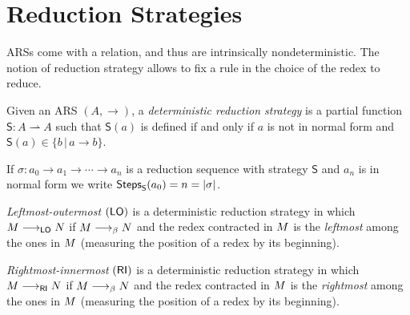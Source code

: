 \section{Reduction Strategies}
ARSs come with a relation, and thus are intrinsically nondeterministic. The notion of reduction strategy allows to fix a rule in the choice of the redex to reduce.
\begin{definition}
	Given an ARS $(A,\rightarrow)$, a \emph{deterministic reduction strategy} is a partial function $\mathsf{S}:A\rightharpoonup A$ such that $\mathsf{S}(a)$ is defined if and only if $a$ is not in normal form and $\mathsf{S}(a)\in\{b\,|\,a\rightarrow b\}$.
\end{definition}
If $\sigma:a_0\rightarrow a_1\rightarrow\cdots\rightarrow a_n$ is a reduction sequence with strategy $\mathsf{S}$ and $a_n$ is in normal form we write $\mathsf{Steps}_{\mathsf{S}}(a_0)=n=|\sigma|$.\\
\begin{definition}
	\emph{Leftmost-outermost} $(\mathsf{LO})$ is a deterministic reduction strategy in which $M\longrightarrow_{\mathsf{LO}}N$ if $M\longrightarrow_\beta N$ and the redex contracted in $M$ is the \emph{leftmost} among the ones in $M$ (measuring the position of a redex by its beginning).
\end{definition}
\begin{definition}
	\emph{Rightmost-innermost} $(\mathsf{RI})$ is a deterministic reduction strategy in which $M\longrightarrow_{\mathsf{RI}}N$ if $M\longrightarrow_\beta N$ and the redex contracted in $M$ is the \emph{rightmost} among the ones in $M$ (measuring the position of a redex by its beginning).
\end{definition}
